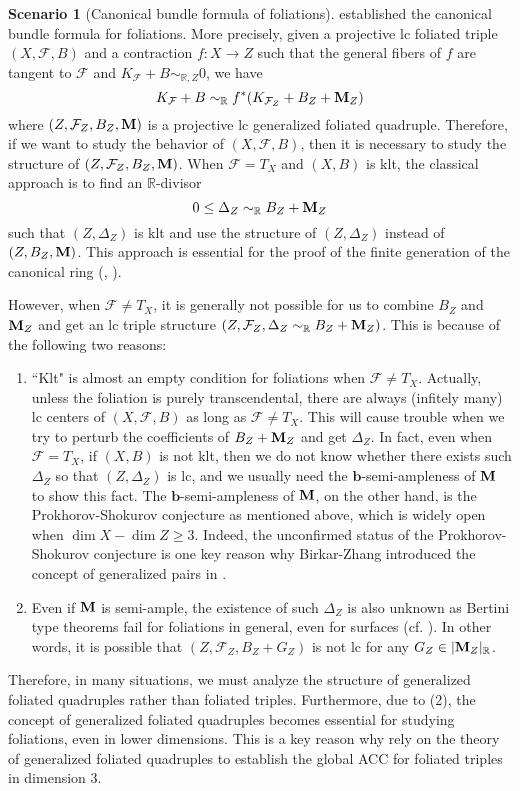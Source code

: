 \documentclass[11pt]{amsart}
\numberwithin{equation}{section}
\newcommand{\bb}{\bm{b}}
\newcommand{\Mm}{{\bf{M}}}
\newcommand{\Rr}{\mathbb{R}}
\newcommand{\Ff}{\mathcal{F}}
\theoremstyle{definition}
\theoremstyle{definition}
\newtheorem{sce}[thm]{Scenario}
\theoremstyle{definition}
\begin{document}
\begin{sce}[Canonical bundle formula of foliations]
\cite[Theorem 1.2]{LLM23} established the canonical bundle formula for foliations. More precisely, given a projective lc foliated triple $(X,\Ff,B)$ and a contraction $f: X\rightarrow Z$ such that the general fibers of $f$ are tangent to $\Ff$ and $K_{\Ff}+B\sim_{\mathbb R,Z}0$, we have
$$K_{\Ff}+B\sim_{\mathbb R}f^*(K_{\Ff_Z}+B_Z+\Mm_Z)$$
where $(Z,\Ff_Z,B_Z,\Mm)$ is a projective lc generalized foliated quadruple. Therefore, if we want to study the behavior of $(X,\Ff,B)$, then it is necessary to study the structure of $(Z,\Ff_Z,B_Z,\Mm)$. When $\Ff=T_X$ and $(X,B)$ is klt, the classical approach is to find an $\Rr$-divisor
$$0\leq\Delta_Z\sim_{\mathbb R}B_Z+\Mm_Z$$
such that $(Z,\Delta_Z)$ is klt \cite[Theorem 0.2]{Amb05} and use the structure of $(Z,\Delta_Z)$ instead of $(Z,B_Z,\Mm)$. This approach is essential for the proof of the finite generation of the canonical ring (\cite[Proof of Corollary 1.1.2]{BCHM10}, \cite{FM00}). 

However, when $\Ff\not=T_X$, it is generally not possible for us to combine $B_Z$ and $\Mm_Z$ and get an lc triple structure $(Z,\Ff_Z,\Delta_Z\sim_{\mathbb R}B_Z+\Mm_Z)$. This is because of the following two reasons:
\begin{enumerate}
    \item ``Klt" is almost an empty condition for foliations when $\Ff\not=T_X$. Actually, unless the foliation is purely transcendental, there are always (infitely many) lc centers of $(X,\Ff,B)$ as long as $\Ff\not=T_X$. This will cause trouble when we try to perturb the coefficients of $B_Z+\Mm_Z$ and get $\Delta_Z$. In fact, even when $\Ff=T_X$, if $(X,B)$ is not klt, then we do not know whether there exists such $\Delta_Z$ so that $(Z,\Delta_Z)$ is lc, and we usually need the $\bb$-semi-ampleness of $\Mm$ to show this fact. The $\bb$-semi-ampleness of $\Mm$, on the other hand, is the Prokhorov-Shokurov conjecture \cite[Conjecture 7.13]{PS09} as mentioned above, which is widely open when $\dim X-\dim Z\geq 3$. Indeed, the unconfirmed status of the Prokhorov-Shokurov conjecture is one key reason why Birkar-Zhang introduced the concept of generalized pairs in \cite{BZ16}.
    \item Even if $\Mm$ is semi-ample, the existence of such $\Delta_Z$ is also unknown as Bertini type theorems fail for foliations in general, even for surfaces (cf. \cite[Example 3.4]{DLM23}). In other words, it is possible that $(Z,\Ff_Z,B_Z+G_Z)$ is not lc for any $G_Z\in |\Mm_Z|_{\mathbb R}$. 
\end{enumerate}
Therefore, in many situations, we must analyze the structure of generalized foliated quadruples rather than foliated triples. Furthermore, due to (2), the concept of generalized foliated quadruples becomes essential for studying foliations, even in lower dimensions. This is a key reason why \cite{LLM23,LMX23b} rely on the theory of generalized foliated quadruples to establish the global ACC for foliated triples in dimension $3$.
\end{sce}
\end{document}
